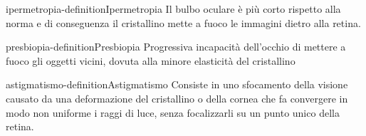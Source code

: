 \documentclass[preview]{standalone}
\begin{document}

\begin{snippetdefinition}{ipermetropia-definition}{Ipermetropia}
    Il bulbo oculare è più corto rispetto alla norma e di conseguenza il cristallino mette a fuoco
    le immagini dietro alla retina.
\end{snippetdefinition}

\begin{snippetdefinition}{presbiopia-definition}{Presbiopia}
    Progressiva incapacità dell'occhio di mettere a fuoco gli oggetti vicini, dovuta alla minore
    elasticità del cristallino
\end{snippetdefinition}

\begin{snippetdefinition}{astigmatismo-definition}{Astigmatismo}
    Consiste in uno sfocamento della visione causato da una deformazione del cristallino o della
    cornea che fa convergere in modo non uniforme i raggi di luce, senza focalizzarli su un
    punto unico della retina.
\end{snippetdefinition}
\end{document}
